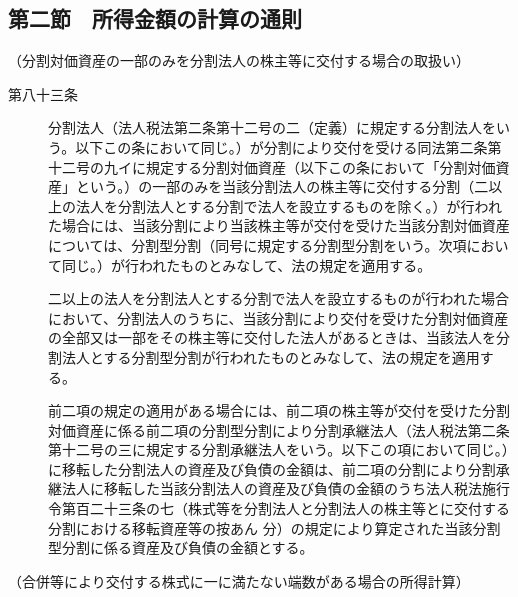 \documentclass[twocolumn,a4j,10pt]{ltjtarticle}
\begin{document}
\subsection*{第二節　所得金額の計算の通則}
\noindent\hspace{10pt}（分割対価資産の一部のみを分割法人の株主等に交付する場合の取扱い）
\begin{description}
\item[第八十三条]分割法人（法人税法第二条第十二号の二（定義）に規定する分割法人をいう。以下この条において同じ。）が分割により交付を受ける同法第二条第十二号の九イに規定する分割対価資産（以下この条において「分割対価資産」という。）の一部のみを当該分割法人の株主等に交付する分割（二以上の法人を分割法人とする分割で法人を設立するものを除く。）が行われた場合には、当該分割により当該株主等が交付を受けた当該分割対価資産については、分割型分割（同号に規定する分割型分割をいう。次項において同じ。）が行われたものとみなして、法の規定を適用する。
\item[]二以上の法人を分割法人とする分割で法人を設立するものが行われた場合において、分割法人のうちに、当該分割により交付を受けた分割対価資産の全部又は一部をその株主等に交付した法人があるときは、当該法人を分割法人とする分割型分割が行われたものとみなして、法の規定を適用する。
\item[]前二項の規定の適用がある場合には、前二項の株主等が交付を受けた分割対価資産に係る前二項の分割型分割により分割承継法人（法人税法第二条第十二号の三に規定する分割承継法人をいう。以下この項において同じ。）に移転した分割法人の資産及び負債の金額は、前二項の分割により分割承継法人に移転した当該分割法人の資産及び負債の金額のうち法人税法施行令第百二十三条の七（株式等を分割法人と分割法人の株主等とに交付する分割における移転資産等の按あん
分）の規定により算定された当該分割型分割に係る資産及び負債の金額とする。
\end{description}
\noindent\hspace{10pt}（合併等により交付する株式に一に満たない端数がある場合の所得計算）
\end{document}
